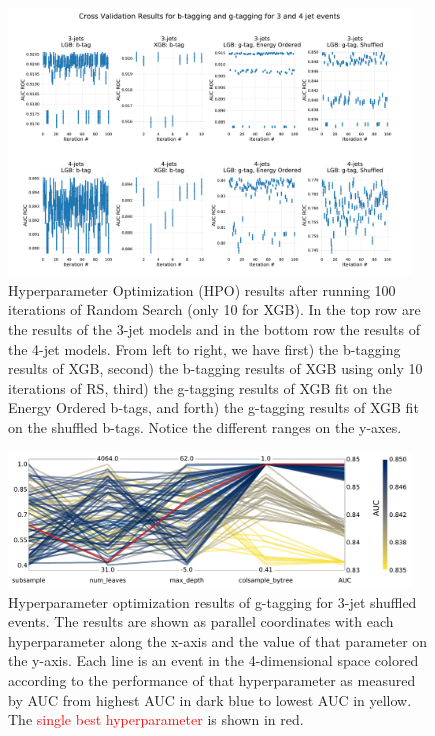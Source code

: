 \documentclass[a4paper, twoside, nobib]{tufte-book}
\begin{document}
\begin{figure}
  \includegraphics[width=0.95\textwidth, trim=10 10 10 60, clip]{figures/quarks/cv_res_lgb-down_sample=1.00-ML_vars=vertex-selection=b-ejet_min=4-n_iter_RS_lgb=99-n_iter_RS_xgb=9-cdot_cut=0.90-version=19.pdf}
  \caption[Hyperparameter Optimization of b- and g-tagging]
          {Hyperparameter Optimization (HPO) results after running 100 iterations of Random Search (only 10 for XGB). In the top row are the results of the 3-jet models and in the bottom row the results of the 4-jet models. From left to right, we have first) the b-tagging results of XGB, second) the b-tagging results of XGB using only 10 iterations of RS, third) the g-tagging results of XGB fit on the Energy Ordered b-tags, and forth) the g-tagging results of XGB fit on the shuffled b-tags. Notice the different ranges on the y-axes.
          } 
  \label{fig:q:CV_res_iterations}
\end{figure}


\begin{figure}
  \includegraphics[width=0.95\textwidth, trim=0 0 0 0, clip]{figures/quarks/CV_viz-njet=3-name=lf_gtag_shuffled_lgb_down_sample=1.00-ML_vars=vertex-selection=b-ejet_min=4-n_iter_RS_lgb=99-n_iter_RS_xgb=9-cdot_cut=0.90-version=19.pdf}
  \caption[Overview of Hyperparamaters of g-tagging for 3-jet shuffled events]
          {Hyperparameter optimization results of g-tagging for 3-jet shuffled events. The results are shown as parallel coordinates with each hyperparameter along the x-axis and the value of that parameter on the y-axis. Each line is an event in the 4-dimensional space colored according to the performance of that hyperparameter as measured by AUC from \textcolor{viridis-dark}{highest} AUC in dark blue to \textcolor{viridis-light}{lowest} AUC in yellow. The \textcolor{red}{single best hyperparameter} is shown in red. 
          } 
  \label{fig:q:CV_res_parallel_coords}
\end{figure}
\end{document}
